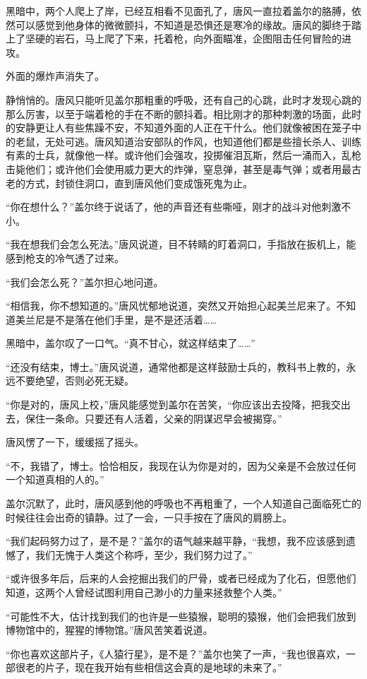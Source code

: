 黑暗中，两个人爬上了岸，已经互相看不见面孔了，唐风一直拉着盖尔的胳膊，依然可以感觉到他身体的微微颤抖，不知道是恐惧还是寒冷的缘故。唐风的脚终于踏上了坚硬的岩石，马上爬了下来，托着枪，向外面瞄准，企图阻击任何冒险的进攻。

外面的爆炸声消失了。

静悄悄的。唐风只能听见盖尔那粗重的呼吸，还有自己的心跳，此时才发现心跳的那么厉害，以至于端着枪的手在不断的颤抖着。相比刚才的那种刺激的场面，此时的安静更让人有些焦躁不安，不知道外面的人正在干什么。他们就像被困在笼子中的老鼠，无处可逃。唐风知道治安部队的作风，也知道他们都是些擅长杀人、训练有素的士兵，就像他一样。或许他们会强攻，投掷催泪瓦斯，然后一涌而入，乱枪击毙他们；或许他们会使用威力更大的炸弹，窒息弹，甚至是毒气弹；或者用最古老的方式，封锁住洞口，直到唐风他们变成饿死鬼为止。

“你在想什么？”盖尔终于说话了，他的声音还有些嘶哑，刚才的战斗对他刺激不小。

“我在想我们会怎么死法。”唐风说道，目不转睛的盯着洞口，手指放在扳机上，能感到枪支的冷气透了过来。

“我们会怎么死？”盖尔担心地问道。

“相信我，你不想知道的。”唐风忧郁地说道，突然又开始担心起美兰尼来了。不知道美兰尼是不是落在他们手里，是不是还活着……

黑暗中，盖尔叹了一口气。“真不甘心，就这样结束了……”

“还没有结束，博士。”唐风说道，通常他都是这样鼓励士兵的，教科书上教的，永远不要绝望，否则必死无疑。

“你是对的，唐风上校，”唐风能感觉到盖尔在苦笑，“你应该出去投降，把我交出去，保住一条命。只要还有人活着，父亲的阴谋迟早会被揭穿。”

唐风愣了一下，缓缓摇了摇头。

“不，我错了，博士。恰恰相反，我现在认为你是对的，因为父亲是不会放过任何一个知道真相的人的。”

盖尔沉默了，此时，唐风感到他的呼吸也不再粗重了，一个人知道自己面临死亡的时候往往会出奇的镇静。过了一会，一只手按在了唐风的肩膀上。

“我们起码努力过了，是不是？”盖尔的语气越来越平静，“我想，我不应该感到遗憾了，我们无愧于人类这个称呼，至少，我们努力过了。”

“或许很多年后，后来的人会挖掘出我们的尸骨，或者已经成为了化石，但愿他们知道，这两个人曾经试图利用自己渺小的力量来拯救整个人类。”

“可能性不大，估计找到我们的也许是一些猿猴，聪明的猿猴，他们会把我们放到博物馆中的，猩猩的博物馆。”唐风苦笑着说道。

“你也喜欢这部片子，《人猿行星》，是不是？”盖尔也笑了一声，“我也很喜欢，一部很老的片子，现在我开始有些相信这会真的是地球的未来了。”

